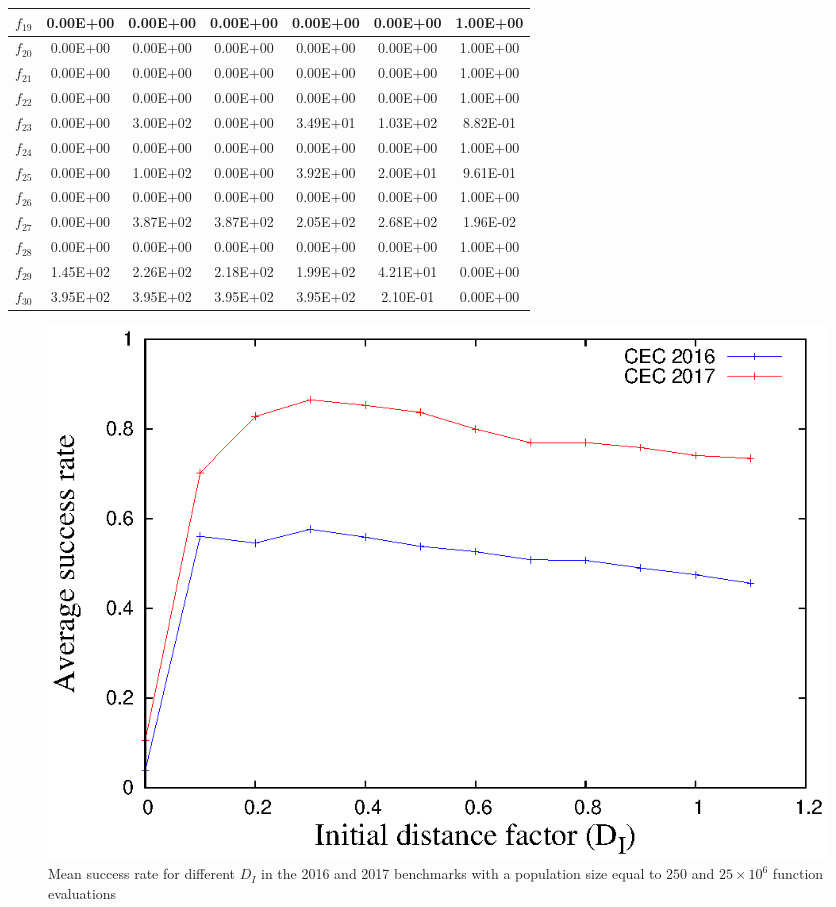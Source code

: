 \begin{table}[t]
\begin{scriptsize}
\begin{tabular}{|c|c|c|c|c|c|c|}
$f_{19}$ & 0.00E+00 & 0.00E+00 & 0.00E+00 & 0.00E+00 & 0.00E+00 & 1.00E+00 \\ \hline
$f_{20}$ & 0.00E+00 & 0.00E+00 & 0.00E+00 & 0.00E+00 & 0.00E+00 & 1.00E+00 \\ \hline
$f_{21}$ & 0.00E+00 & 0.00E+00 & 0.00E+00 & 0.00E+00 & 0.00E+00 & 1.00E+00 \\ \hline
$f_{22}$ & 0.00E+00 & 0.00E+00 & 0.00E+00 & 0.00E+00 & 0.00E+00 & 1.00E+00 \\ \hline
$f_{23}$ & 0.00E+00 & 3.00E+02 & 0.00E+00 & 3.49E+01 & 1.03E+02 & 8.82E-01 \\ \hline
$f_{24}$ & 0.00E+00 & 0.00E+00 & 0.00E+00 & 0.00E+00 & 0.00E+00 & 1.00E+00 \\ \hline
$f_{25}$ & 0.00E+00 & 1.00E+02 & 0.00E+00 & 3.92E+00 & 2.00E+01 & 9.61E-01 \\ \hline
$f_{26}$ & 0.00E+00 & 0.00E+00 & 0.00E+00 & 0.00E+00 & 0.00E+00 & 1.00E+00 \\ \hline
$f_{27}$ & 0.00E+00 & 3.87E+02 & 3.87E+02 & 2.05E+02 & 2.68E+02 & 1.96E-02 \\ \hline
$f_{28}$ & 0.00E+00 & 0.00E+00 & 0.00E+00 & 0.00E+00 & 0.00E+00 & 1.00E+00 \\ \hline
$f_{29}$ & 1.45E+02 & 2.26E+02 & 2.18E+02 & 1.99E+02 & 4.21E+01 & 0.00E+00 \\ \hline
$f_{30}$ & 3.95E+02 & 3.95E+02 & 3.95E+02 & 3.95E+02 & 2.10E-01 & 0.00E+00 \\ \hline
\end{tabular}%
\end{scriptsize}
\end{table}

\begin{figure}[t]
\centering
  \includegraphics[scale=0.6]{Tuning_CEC.eps}
\caption{Mean success rate for different $D_I$ in the \CEC{} 2016 and \CEC{} 2017 benchmarks with a population size equal to $250$ and $25 \times 10^6$ function evaluations}
\label{fig:one}
\end{figure}

